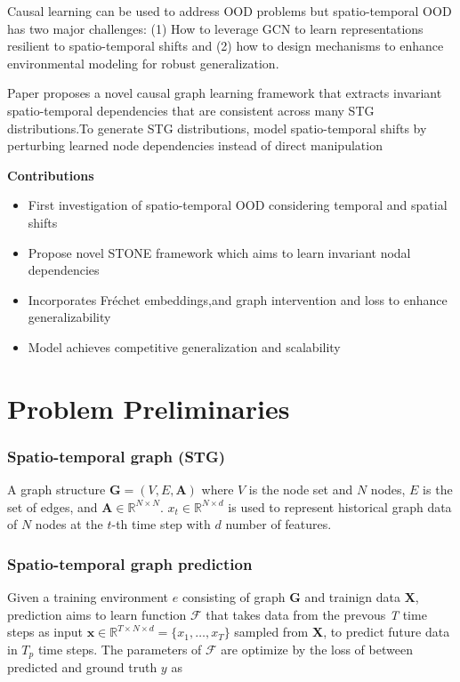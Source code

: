 \documentclass[11pt]{article}
\begin{document}
Causal learning can be used to address OOD problems but spatio-temporal OOD has two major challenges: (1) How to leverage GCN to learn representations resilient to spatio-temporal shifts and (2) how to design mechanisms to enhance environmental modeling for robust generalization.

Paper proposes a novel causal graph learning framework that extracts invariant spatio-temporal dependencies that are consistent across many STG distributions.To generate STG distributions, model spatio-temporal shifts by perturbing learned node dependencies instead of direct manipulation

\textbf{Contributions}

\begin{itemize}
  \item First investigation of spatio-temporal OOD considering temporal and spatial shifts
  \item Propose novel STONE framework which aims to learn invariant nodal dependencies
  \item Incorporates Fréchet embeddings,and graph intervention and loss to enhance generalizability
  \item Model achieves competitive generalization and scalability
\end{itemize}

\section{Problem Preliminaries}

\subsubsection{Spatio-temporal graph (STG)}
A graph structure $\mathbf{G}=(V, E, \mathbf{A})$ where $V$ is the node set and $N$ nodes, $E$ is the set of edges, and $\mathbf{A}\in\mathbb{R}^{N\times N}$. $x_t\in\mathbb{R}^{N\times d}$ is used to represent historical graph data of $N$ nodes at the $t$-th time step with $d$ number of features.

\subsubsection{Spatio-temporal graph prediction} Given a training environment $e$ consisting of graph \textbf{G} and trainign data \textbf{X}, prediction aims to learn function $\mathcal{F}$ that takes data from the prevous \textit{T} time steps as input $\mathbf{x}\in\mathbb{R}^{T\times N\times d} = \{x_1,\ldots, x_T\}$ sampled from \textbf{X}, to predict future data in $T_p$ time steps. The parameters of $\mathcal{F}$ are optimize by the loss of between predicted and ground truth $y$ as
\end{document}
